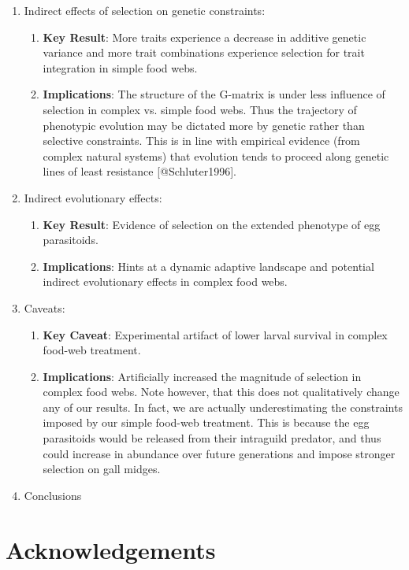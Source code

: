 \documentclass[11pt,]{article}
\begin{document}
\begin{enumerate}
 \item Indirect effects of selection on genetic constraints: 
    \begin{enumerate}
    \item \textbf{Key Result}: More traits experience a decrease in additive genetic variance and more trait combinations experience selection for trait integration in simple food webs. 
    \item \textbf{Implications}: The structure of the G-matrix is under less influence of selection in complex vs. simple food webs. Thus the trajectory of phenotypic evolution may be dictated more by genetic rather than selective constraints. This is in line with empirical evidence (from complex natural systems) that evolution tends to proceed along genetic lines of least resistance [@Schluter1996].
    \end{enumerate}
    
 \item Indirect evolutionary effects:
    \begin{enumerate}
    \item \textbf{Key Result}: Evidence of selection on the extended phenotype of egg parasitoids.
    \item \textbf{Implications}: Hints at a dynamic adaptive landscape and potential indirect evolutionary effects in complex food webs.
    \end{enumerate}
    
 \item Caveats: 
    \begin{enumerate} 
    \item \textbf{Key Caveat}: Experimental artifact of lower larval survival in complex food-web treatment.
    \item \textbf{Implications}: Artificially increased the magnitude of selection in complex food webs. Note however, that this does not qualitatively change any of our results. In fact, we are actually underestimating the constraints imposed by our simple food-web treatment. This is because the egg parasitoids would be released from their intraguild predator, and thus could increase in abundance over future generations and impose stronger selection on gall midges. 
    \end{enumerate}

\item Conclusions

\end{enumerate}

\section{Acknowledgements}\label{acknowledgements}
\end{document}
